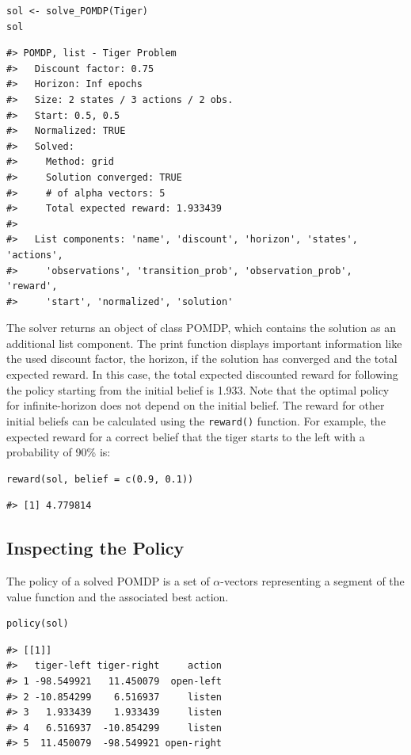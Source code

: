 \begin{verbatim}
sol <- solve_POMDP(Tiger)
sol
\end{verbatim}

\begin{verbatim}
#> POMDP, list - Tiger Problem
#>   Discount factor: 0.75
#>   Horizon: Inf epochs
#>   Size: 2 states / 3 actions / 2 obs.
#>   Start: 0.5, 0.5
#>   Normalized: TRUE
#>   Solved:
#>     Method: grid
#>     Solution converged: TRUE
#>     # of alpha vectors: 5
#>     Total expected reward: 1.933439
#> 
#>   List components: 'name', 'discount', 'horizon', 'states', 'actions',
#>     'observations', 'transition_prob', 'observation_prob', 'reward',
#>     'start', 'normalized', 'solution'
\end{verbatim}

The solver returns an object of class POMDP, which contains the solution as an
additional list component. The print function displays important information like the
used discount factor, the horizon, if the solution has converged and the total expected reward. In this case, the total expected discounted reward for following the policy starting from the initial belief is 1.933.
Note that
the optimal policy for infinite-horizon does not depend on the
initial belief.
The reward for other initial beliefs can be calculated using the
\texttt{reward()} function. For example, the expected reward for a correct
belief that the tiger starts to the left with a probability of 90\% is:

\begin{verbatim}
reward(sol, belief = c(0.9, 0.1)) 
\end{verbatim}

\begin{verbatim}
#> [1] 4.779814
\end{verbatim}

\hypertarget{inspecting-the-policy}{%
\subsection{Inspecting the Policy}\label{inspecting-the-policy}}

The policy of a solved POMDP is a set of \(\alpha\)-vectors
representing a segment of the value function and the
associated best action.

\begin{verbatim}
policy(sol)
\end{verbatim}

\begin{verbatim}
#> [[1]]
#>   tiger-left tiger-right     action
#> 1 -98.549921   11.450079  open-left
#> 2 -10.854299    6.516937     listen
#> 3   1.933439    1.933439     listen
#> 4   6.516937  -10.854299     listen
#> 5  11.450079  -98.549921 open-right
\end{verbatim}

